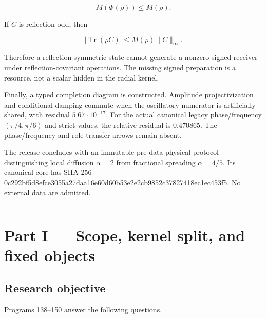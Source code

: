 \documentclass[11pt,a4paper,openany]{report}
\begin{document}
\[
M(\Phi(\rho))\le M(\rho).
\]

If \(C\) is reflection odd, then

\[
|\operatorname{Tr}(\rho C)|
\le
M(\rho)\|C\|_\infty.
\]

Therefore a reflection-symmetric state cannot generate a nonzero signed receiver under reflection-covariant operations. The missing signed preparation is a resource, not a scalar hidden in the radial kernel.

Finally, a typed completion diagram is constructed. Amplitude projectivization and conditional damping commute when the oscillatory numerator is artificially shared, with residual \(5.67\cdot10^{-17}\). For the actual canonical legacy phase/\allowbreak{}frequency \((\pi/4,\pi/6)\) and strict values, the relative residual is \(0.470865\). The phase/\allowbreak{}frequency and role-transfer arrows remain absent.

The release concludes with an immutable pre-data physical protocol distinguishing local diffusion \(\alpha=2\) from fractional spreading \(\alpha=4/5\). Its canonical core has SHA-256 0c292bf5d8efce3055a27daa16e60d60b53e2e2cb9852c37827418ec1ec453f5. No external data are admitted.

\par\medskip\hrule\medskip

\chapter{Part I --- Scope, kernel split, and fixed objects}

\section{Research objective}

Programs 138--150 answer the following questions.
\end{document}
